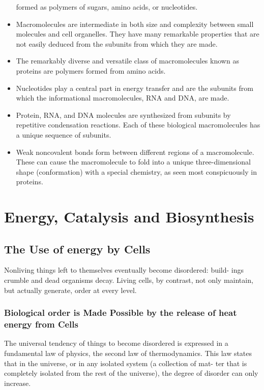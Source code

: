 \begin{itemize}
formed as polymers of sugars, amino acids, or nucleotides.
\item Macromolecules are intermediate in both size and complexity between
small molecules and cell organelles. They have many remarkable
properties that are not easily deduced from the subunits from which
they are made.
\item The remarkably diverse and versatile class of macromolecules known
as proteins are polymers formed from amino acids.
\item Nucleotides play a central part in energy transfer and are the subunits
from which the informational macromolecules, RNA and DNA, are made.
\item Protein, RNA, and DNA molecules are synthesized from subunits by
repetitive condensation reactions. Each of these biological macromolecules
has a unique sequence of subunits.
\item Weak noncovalent bonds form between different regions of a macromolecule.
These can cause the macromolecule to fold into a unique
three-dimensional shape (conformation) with a special chemistry, as
seen most conspicuously in proteins.
\end{itemize}

\chapter{Energy, Catalysis and Biosynthesis}

\section{The Use of energy by Cells}

Nonliving things left to themselves eventually become disordered: build-
ings crumble and dead organisms decay. Living cells, by contrast, not
only maintain, but actually generate, order at every level.

\subsection{Biological order is Made Possible by the release of heat energy from Cells}

The universal tendency of things to become disordered is expressed in a
fundamental law of physics, the second law of thermodynamics. This law
states that in the universe, or in any isolated system (a collection of mat-
ter that is completely isolated from the rest of the universe), the degree
of disorder can only increase.

